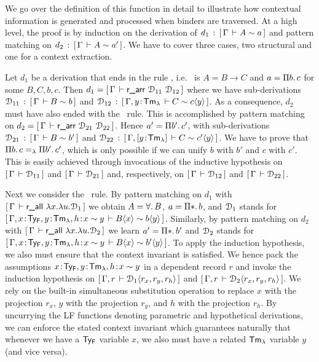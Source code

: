 We go over the definition of this function in detail to illustrate how contextual information is generated and processed when binders are traversed.
At a high level, the proof is by induction on the derivation of $d_1 \mathrel{\, : \,} [\,\Gamma\,\vdash A \mathrel{\sim} a\,]$ and pattern matching on $d_2 \mathrel{\, : \,} [\,\Gamma\,\vdash A \mathrel{\sim} a'\,]$.
We have to cover three cases, two structural and one for a context extraction.

Let $d_1$ be a derivation that ends in the rule \rarr, i.e.~ is $A = B \to C$ and $a = \Pi b.\,c$ for some $B,C,b,c$. Then $d_1 = [\,\Gamma\,\vdash \textsf{r\_arr}~\mathcal{D}_{11}~\mathcal{D}_{12}\,]$ where 
we have sub-derivations $\mathcal{D}_{11} \mathrel{\, : \,} [\,\Gamma\,\vdash B \mathrel{\sim} b\,]$ and $\mathcal{D}_{12} \mathrel{\, : \,} [\,\Gamma, y \!:\! \mathsf{Tm_{\lambda}}\,\vdash C \mathrel{\sim} c\langle y\rangle\,]$.
As a consequence, $d_2$ must have also ended with the \rarr~rule. This is accomplished by pattern matching on $d_2 = [\,\Gamma\,\vdash \textsf{r\_arr}~\mathcal{D}_{21}~\mathcal{D}_{22}\,]$. Hence $a' = \Pi b'.\,c'$, with sub-derivations $\mathcal{D}_{21} \mathrel{\, : \,} [\,\Gamma\,\vdash B \mathrel{\sim} b'\,]$ and $\mathcal{D}_{22} \mathrel{\, : \,} [\,\Gamma, [y \!:\! \mathsf{Tm_{\lambda}}]\,\vdash C \mathrel{\sim} c'\langle y\rangle\,]$.
We have to prove that $\Pi b.\,c =_{\lambda} \Pi b'.\,c'$, which is only possible if we can unify $b$ with $b'$ and $c$ with $c'$.
This is easily achieved through invocations of the inductive hypothesis on $[\,\Gamma\,\vdash \mathcal{D}_{11}\,]$ and $[\,\Gamma\,\vdash \mathcal{D}_{21}\,]$ and, respectively, on $[\,\Gamma\,\vdash \mathcal{D}_{12}\,]$ and $[\,\Gamma\,\vdash \mathcal{D}_{22}\,]$.

Next we consider the \rall~rule. By pattern matching on $d_1$ with $[\,\Gamma\,\vdash \textsf{r\_all}~\lambda x.\lambda u.\mathcal{D}_1\,]$ we obtain $A = \forall.\, B$, $a = \Prod{\Prp} b$, 
and $\mathcal{D}_1$ stands for $[\,\Gamma, x \!:\! \mathsf{Ty_{F}}, y \!:\! \mathsf{Tm_{\lambda}}, h \!:\! x \mathrel{\sim} y\,\vdash B\langle x\rangle \mathrel{\sim} b\langle y\rangle\,]$.  
Similarly, by pattern matching on $d_2$ with $[\,\Gamma\,\vdash \textsf{r\_all}~\lambda x.\lambda u.\mathcal{D}_2\,]$ we learn $a' = \Prod{\Prp} b'$ and $\mathcal{D}_2$ stands for 
$[\,\Gamma, x \!:\! \mathsf{Ty_{F}}, y \!:\! \mathsf{Tm_{\lambda}}, h \!:\! x \mathrel{\sim} y\,\vdash B\langle x\rangle \mathrel{\sim} b'\langle y\rangle\,]$.  
%
To apply the induction hypothesis, we also must ensure that the context invariant is satisfied. We hence pack the assumptions $ x \!:\! \mathsf{Ty_{F}}, y \!:\! \mathsf{Tm_{\lambda}}, h \!:\! x \mathrel{\sim} y$ in a dependent record $r$ and 
invoke the induction hypothesis on $[\,\Gamma, r\,\vdash \mathcal{D}_1\langle r_x,r_y,r_h\rangle\,]$ and $[\,\Gamma, r\,\vdash \mathcal{D}_2\langle r_x,r_y,r_h\rangle\,]$. We rely on the built-in simultaneous substitution operation to replace $x$ with the projection $r_x$, $y$ with the projection $r_y$, and $h$ with the projection $r_h$. By uncurrying the LF functions denoting parametric and hypothetical derivations, we can enforce the stated context invariant which guarantees naturally that whenever we have a $\mathsf{Ty_{F}}$ variable $x$, we also must have a related  $\mathsf{Tm_{\lambda}}$ variable $y$ (and vice versa).
 

